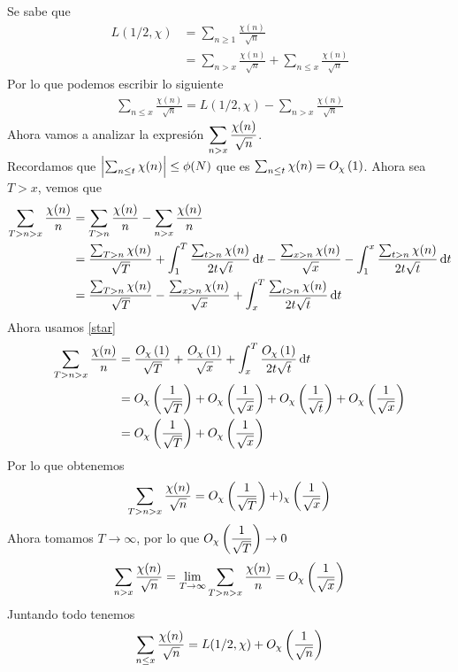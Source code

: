 \begin{sol}
	Se sabe que
	\begin{align*}
		L(1/2,\chi) & =\sum_{n\geq1}\frac{\chi(n)}{\sqrt{n}}                                     \\
		            & =\sum_{n>x}\frac{\chi(n)}{\sqrt{n}}+\sum_{n\leq x}\frac{\chi(n)}{\sqrt{n}}
	\end{align*}
	Por lo que podemos escribir lo siguiente
	\begin{align*}
		\sum_{n\leq x}\frac{\chi(n)}{\sqrt{n}}=L(1/2,\chi)-\sum_{n>x}\frac{\chi(n)}{\sqrt{n}}
	\end{align*}
	Ahora vamos a analizar la expresión $\ds\sum_{n>x}\frac{\chi(n)}{\sqrt{n}}$.\\
	Recordamos que $\abs{\sum_{n\leq t}\chi(n)}\leq\phi(N)$ que es $\sum_{n\leq t}\chi(n)=\BigO[\chi]{1}\label{star}$. Ahora sea $T>x$, vemos que
	\begin{align*}
		\sum_{T>n>x}\frac{\chi(n)}{n} & =\sum_{T>n}\frac{\chi(n)}{n}-\sum_{n>x}\frac{\chi(n)}{n}                                                                                                     \\
		                              & =\frac{\sum_{T>n}\chi(n)}{\sqrt{T}}+\int_1^T\frac{\sum_{t>n}\chi(n)}{2t\sqrt{t}}\d{t}-\frac{\sum_{x>n}\chi(n)}{\sqrt{x}}-\int_1^x\frac{\sum_{t>n}\chi(n)}{2t\sqrt{t}}\d{t} \\
		                              & =\frac{\sum_{T>n}\chi(n)}{\sqrt{T}}-\frac{\sum_{x>n}\chi(n)}{\sqrt{x}}+\int_x^T\frac{\sum_{t>n}\chi(n)}{2t\sqrt{t}}\d{t}
	\end{align*}
	Ahora usamos \eqref{star}
	\begin{align*}
		\sum_{T>n>x}\frac{\chi(n)}{n} & = \frac{\BigO[\chi]{1}}{\sqrt{T}}+\frac{\BigO[\chi]{1}}{\sqrt{x}}+\int_x^T\frac{\BigO[\chi]{1}}{2t\sqrt{t}}\d{t}         \\
		                              & =\BigO[\chi]{\frac1{\sqrt{T}}}+\BigO[\chi]{\frac1{\sqrt{x}}}+\BigO[\chi]{\frac1{\sqrt{t}}}+\BigO[\chi]{\frac1{\sqrt{x}}} \\
		                              & =\BigO[\chi]{\frac1{\sqrt{T}}}+\BigO[\chi]{\frac1{\sqrt{x}}}
	\end{align*}
	Por lo que obtenemos
	\begin{equation*}
		\sum_{T>n>x}\frac{\chi(n)}{\sqrt{n}}=\BigO[\chi]{\frac1{\sqrt{T}}}+)_\chi\paren{\frac1{\sqrt{x}}}
	\end{equation*}
	Ahora tomamos $T\rightarrow\infty$, por lo que $\BigO[\chi]{\dfrac1{\sqrt{T}}}\rightarrow0$
	\begin{equation*}
		\sum_{n>x}\frac{\chi(n)}{\sqrt{n}}=\lim_{T\rightarrow\infty}\sum_{T>n>x}\frac{\chi(n)}{n}=\BigO[\chi]{\frac1{\sqrt{x}}}
	\end{equation*}
	Juntando todo tenemos
	\begin{equation*}
		\sum_{n\leq x}\frac{\chi(n)}{\sqrt{n}}=L(1/2,\chi)+\BigO[\chi]{\frac1{\sqrt{n}}}
	\end{equation*}
\end{sol}

